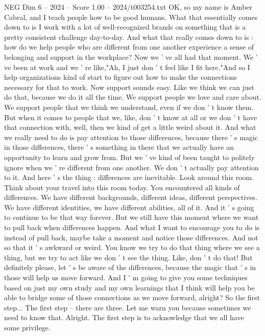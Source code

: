 \begin{textsample}{NEG Dim 6 – 2024 – Score 1.00 – 2024/t003254.txt}  \label{ex:f6_neg_004}
OK, so my name is Amber Cabral, and I teach people how to be good humans.
What that essentially comes down to is I work with a lot of well-recognized brands on something that is a pretty consistent challenge day-to-day.
And what that really comes down to is : how do we help people who are different from one another experience a sense of belonging and support in the workplace?
Now we ' ve all had that moment.
We ' ve been at work and we ' re like,"Ah, I just don ' t feel like I fit here."And so I help organizations kind of start to figure out how to make the connections necessary for that to work.
Now support sounds easy.
Like we think we can just do that, because we do it all the time.
We support people we love and care about.
We support people that we think we understand, even if we don ' t know them.
But when it comes to people that we, like, don ' t know at all or we don ' t have that connection with, well, then we kind of get a little weird about it.
And what we really need to do is pay attention to those differences, because there ' s magic in those differences, there ' s something in there that we actually have an opportunity to learn and grow from.
But we ' ve kind of been taught to politely ignore when we ' re different from one another.
We don ' t actually pay attention to it.
And here ' s the thing : differences are inevitable.
Look around this room.
Think about your travel into this room today.
You encountered all kinds of differences.
We have different backgrounds, different ideas, different perspectives.
We have different identities, we have different abilities, all of it.
And it ' s going to continue to be that way forever.
But we still have this moment where we want to pull back when differences happen.
And what I want to encourage you to do is instead of pull back, maybe take a moment and notice those differences.
And not so that it ' s awkward or weird.
You know we try to do that thing where we see a thing, but we try to act like we don ' t see the thing.
Like, don ' t do that!
But definitely please, let ' s be aware of the differences, because the magic that ' s in those will help us move forward.
And I ' m going to give you some techniques based on just my own study and my own learnings that I think will help you be able to bridge some of those connections as we move forward, alright?
So the first step...
The first step -- there are three.
Let me warn you because sometimes we need to know that.
Alright.
The first step is to acknowledge that we all have some privilege.

\end{textsample}
